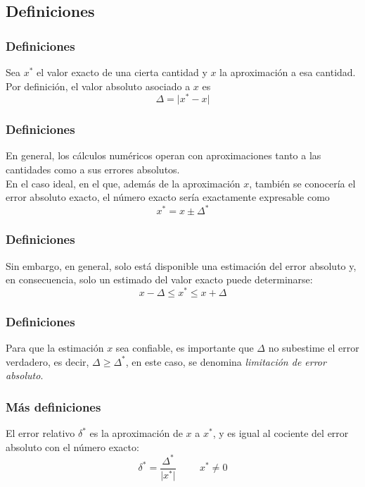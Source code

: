 \subsection{Definiciones}
\begin{frame}[fragile]
\frametitle{Definiciones}
Sea $x^{*}$ el valor exacto de una cierta cantidad y $x$ la aproximación a esa cantidad.
\\
\bigskip
Por definición, el valor absoluto asociado a $x$ es
\begin{equation}
\Delta = \vert x^{*} - x \vert 
\label{eq:ecuacion_01_03}	
\end{equation}
\end{frame}
\begin{frame}
\frametitle{Definiciones}
En general, los cálculos numéricos operan con aproximaciones tanto a las cantidades como a sus errores absolutos.
\\
\bigskip
En el caso ideal, en el que, además de la aproximación $x$, también se conocería el error absoluto exacto, el número exacto sería exactamente expresable como
\begin{equation}
x^{*} = x \pm \Delta^{*}
\label{eq:ecuacion_01_04}    	
\end{equation}    
\end{frame}
\begin{frame}
\frametitle{Definiciones}
Sin embargo, en general, solo está disponible una estimación del error absoluto y, en consecuencia, solo un estimado del valor exacto puede determinarse:
\begin{equation}
x - \Delta \leq x^{*} \leq x + \Delta
\label{eq:ecuacion_01_05}
\end{equation}
\end{frame}
\begin{frame}
\frametitle{Definiciones}
Para que la estimación $x$ sea confiable, es importante que $\Delta$ no subestime el error verdadero, es decir, $\Delta \geq \Delta^{*}$, en este caso, se denomina \emph{limitación de error absoluto}.
\end{frame}
\begin{frame}
\frametitle{Más definiciones}
El error relativo $\delta^{*}$ es la aproximación de $x$ a $x^{*}$, y es igual al cociente del error absoluto con el número exacto:
\begin{equation}
\delta^{*} = \dfrac{\Delta^{*}}{\vert x^{*} \vert} \hspace{1cm} x^{*} \neq 0
\label{eq:ecuacion_01_06}
\end{equation}
\end{frame}
